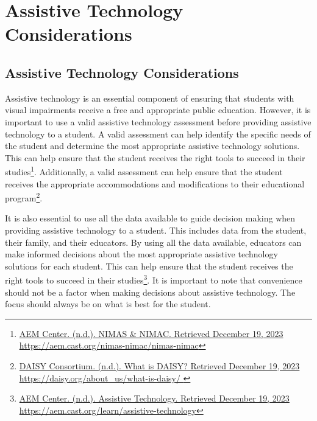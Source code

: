 \hypertarget{trouble3}{}\chapter[\hfill\break\raggedright Assistive Technology Considerations]{Assistive Technology Considerations}\label{trouble3}
{\hfill\break\let\clearpage\relax\localtableofcontents}\newpage
\hypertarget{trouble5}{}\section[Assistive Technology Considerations]{Assistive Technology Considerations}\label{trouble5}
Assistive technology is an essential component of ensuring that students with visual impairments receive a free and appropriate public education. However, it is important to use a valid assistive technology assessment before providing assistive technology to a student. A valid assessment can help identify the specific needs of the student and determine the most appropriate assistive technology solutions. This can help ensure that the student receives the right tools to succeed in their studies\footnote{\raggedright \href{https://aem.cast.org/nimas-nimac/nimas-nimac}{AEM Center. (n.d.). NIMAS \& NIMAC. Retrieved December 19, 2023} \url{https://aem.cast.org/nimas-nimac/nimas-nimac}}. Additionally, a valid assessment can help ensure that the student receives the appropriate accommodations and modifications to their educational program\footnote{\raggedright \href{https://daisy.org/about_us/what-is-daisy/ }{DAISY Consortium. (n.d.). What is DAISY? Retrieved December 19, 2023} \url{https://daisy.org/about_us/what-is-daisy/ }}.

It is also essential to use all the data available to guide decision making when providing assistive technology to a student. This includes data from the student, their family, and their educators. By using all the data available, educators can make informed decisions about the most appropriate assistive technology solutions for each student. This can help ensure that the student receives the right tools to succeed in their studies\footnote{\raggedright \href{https://aem.cast.org/learn/assistive-technology}{AEM Center. (n.d.). Assistive Technology. Retrieved December 19, 2023} \url{https://aem.cast.org/learn/assistive-technology}}. It is important to note that convenience should not be a factor when making decisions about assistive technology. The focus should always be on what is best for the student.

